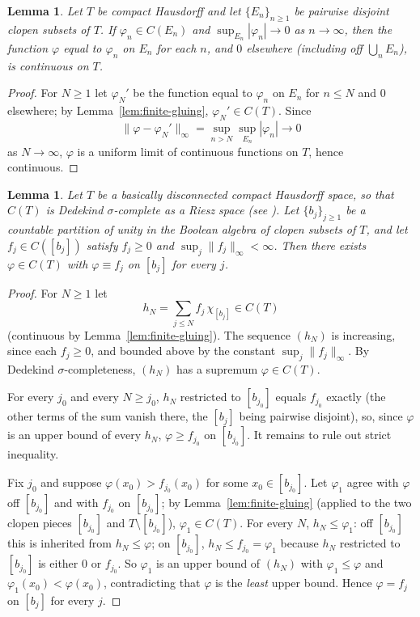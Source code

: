 \documentclass{amsart}
\newtheorem{lemma}[theorem]{Lemma}
\theoremstyle{definition}
\theoremstyle{remark}
\newcommand{\cont}[1]{C\left(#1\right)}
\begin{document}
\begin{lemma}\label{lem:tail-gluing}
Let $T$ be compact Hausdorff and let $\{E_n\}_{n\geq1}$ be pairwise
disjoint clopen subsets of $T$. If $\varphi_n\in\cont{E_n}$ and
$\sup_{E_n}|\varphi_n|\to0$ as $n\to\infty$, then the function $\varphi$
equal to $\varphi_n$ on $E_n$ for each $n$, and $0$ elsewhere (including
off $\bigcup_nE_n$), is continuous on $T$.
\end{lemma}

\begin{proof}
For $N\geq1$ let $\varphi_N'$ be the function equal to $\varphi_n$ on
$E_n$ for $n\leq N$ and $0$ elsewhere; by Lemma~\ref{lem:finite-gluing},
$\varphi_N'\in\cont{T}$. Since
\[
\|\varphi-\varphi_N'\|_\infty=\sup_{n>N}\sup_{E_n}|\varphi_n|\to0
\]
as $N\to\infty$, $\varphi$ is a uniform limit of continuous functions on
$T$, hence continuous.
\end{proof}

\begin{lemma}\label{lem:sigma-gluing}
Let $T$ be a basically disconnected compact Hausdorff space, so that
$\cont{T}$ is Dedekind $\sigma$-complete as a Riesz space (see
\cite[Thm.~5.6(v)]{bezhanishvili-tressl-2026}). Let $\{b_j\}_{j\geq1}$ be
a countable partition of unity in the Boolean algebra of clopen subsets
of $T$, and let $f_j\in\cont{[b_j]}$ satisfy $f_j\geq0$ and
$\sup_j\|f_j\|_\infty<\infty$. Then there exists $\varphi\in\cont{T}$
with $\varphi\equiv f_j$ on $[b_j]$ for every $j$.
\end{lemma}

\begin{proof}
For $N\geq1$ let
\[
h_N=\sum_{j\leq N}f_j\,\chi_{[b_j]}\in\cont{T}
\]
(continuous by Lemma~\ref{lem:finite-gluing}). The sequence $(h_N)$ is
increasing, since each $f_j\geq0$, and bounded above by the constant
$\sup_j\|f_j\|_\infty$. By Dedekind $\sigma$-completeness, $(h_N)$ has a
supremum $\varphi\in\cont{T}$.

For every $j_0$ and every $N\geq j_0$, $h_N$ restricted to $[b_{j_0}]$
equals $f_{j_0}$ exactly (the other terms of the sum vanish there, the
$[b_j]$ being pairwise disjoint), so, since $\varphi$ is an upper bound
of every $h_N$, $\varphi\geq f_{j_0}$ on $[b_{j_0}]$. It remains to rule
out strict inequality.

Fix $j_0$ and suppose $\varphi(x_0)>f_{j_0}(x_0)$ for some
$x_0\in[b_{j_0}]$. Let $\varphi_1$ agree with $\varphi$ off $[b_{j_0}]$
and with $f_{j_0}$ on $[b_{j_0}]$; by Lemma~\ref{lem:finite-gluing}
(applied to the two clopen pieces $[b_{j_0}]$ and $T\setminus[b_{j_0}]$),
$\varphi_1\in\cont{T}$. For every $N$, $h_N\leq\varphi_1$: off
$[b_{j_0}]$ this is inherited from $h_N\leq\varphi$; on $[b_{j_0}]$,
$h_N\leq f_{j_0}=\varphi_1$ because $h_N$ restricted to $[b_{j_0}]$ is
either $0$ or $f_{j_0}$. So $\varphi_1$ is an upper bound of $(h_N)$ with
$\varphi_1\leq\varphi$ and $\varphi_1(x_0)<\varphi(x_0)$, contradicting
that $\varphi$ is the \emph{least} upper bound. Hence $\varphi=f_j$ on
$[b_j]$ for every $j$.
\end{proof}
\end{document}
